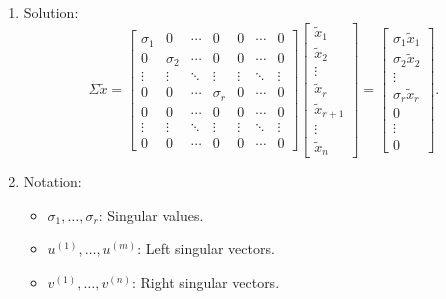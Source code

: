 \begin{derivation}
\begin{enumerate}
        \item Solution:
        \[
        \Sigma \tilde{x} = 
        \begin{bmatrix}
            \sigma_1 & 0 & \cdots & 0 & 0 & \cdots & 0 \\
            0 & \sigma_2 & \cdots & 0 & 0 & \cdots & 0 \\
            \vdots & \vdots & \ddots & \vdots & \vdots & \ddots & \vdots \\
            0 & 0 & \cdots & \sigma_r & 0 & \cdots & 0 \\
            0 & 0 & \cdots & 0 & 0 & \cdots & 0 \\
            \vdots & \vdots & \ddots & \vdots & \vdots & \ddots & \vdots \\
            0 & 0 & \cdots & 0 & 0 & \cdots & 0
        \end{bmatrix}
        \begin{bmatrix}
            \tilde{x}_1 \\
            \tilde{x}_2 \\
            \vdots \\
            \tilde{x}_r \\
            \tilde{x}_{r+1} \\
            \vdots \\
            \tilde{x}_n
        \end{bmatrix}
        =
        \begin{bmatrix}
            \sigma_1 \tilde{x}_1 \\
            \sigma_2 \tilde{x}_2 \\
            \vdots \\
            \sigma_r \tilde{x}_r \\
            0 \\
            \vdots \\
            0
        \end{bmatrix}.
        \]
     
        \item Notation:
        \begin{itemize}
            \item \( \sigma_1, \dots, \sigma_r \): Singular values.
            \item \( u^{(1)}, \dots, u^{(m)} \): Left singular vectors.
            \item \( v^{(1)}, \dots, v^{(n)} \): Right singular vectors.
        \end{itemize}
     

\end{enumerate}
\end{derivation}
